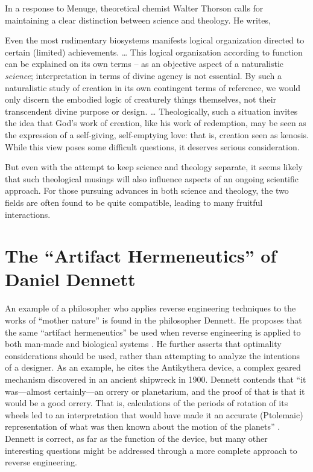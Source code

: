In a response to Menuge, theoretical chemist Walter Thorson calls for
maintaining a clear distinction between science and theology. He
writes,

\begin{quoting}
Even the most rudimentary biosystems manifests logical
organization directed to certain (limited) achievements. {\ldots} This logical
organization according to function can be explained on its own terms –
as an objective aspect of a naturalistic \textit{science};
interpretation in terms of divine agency is not essential. By such a
naturalistic study of creation in its own contingent terms of
reference, we would only discern the embodied logic of creaturely
things themselves, not their transcendent divine purpose or
design. {\ldots} Theologically, such a situation invites the idea that God’s work
of creation, like his work of redemption, may be seen as the expression
of a self-giving, self-emptying love: that is, creation seen as
kenosis. While this view poses some difficult questions, it deserves
serious consideration. \citep[][p.~101]{thorson2003} 
\end{quoting}

But even with the attempt
to keep science and theology separate, it seems likely that such
theological musings will also influence aspects of an ongoing
scientific approach. For those pursuing advances in both science and
theology, the two fields are often found to be quite compatible,
leading to many fruitful interactions.

\section{The “Artifact Hermeneutics” of Daniel Dennett}

An example of a philosopher who applies reverse engineering
techniques to the works of “mother nature” is found in the
philosopher Dennett. He proposes that the same ``artifact hermeneutics'' be used
when reverse engineering is applied to both man-made and biological
systems \citep[][p.~177]{dennett1990}. He further asserts that optimality
considerations should be used, rather than attempting to analyze the
intentions of a designer. As an example, he cites the Antikythera
device, a complex geared mechanism discovered in an ancient shipwreck
in 1900. Dennett contends that “it was---almost certainly---an orrery
or planetarium, and the proof of that is that it would be a good
orrery. That is, calculations of the periods of rotation of its wheels
led to an interpretation that would have made it an accurate
(Ptolemaic) representation of what was then known about the motion of
the planets” \citep[][p.~180]{dennett1990}. Dennett is correct, as far as the
function of the device, but many other interesting questions might be
addressed through a more complete approach to reverse engineering.

